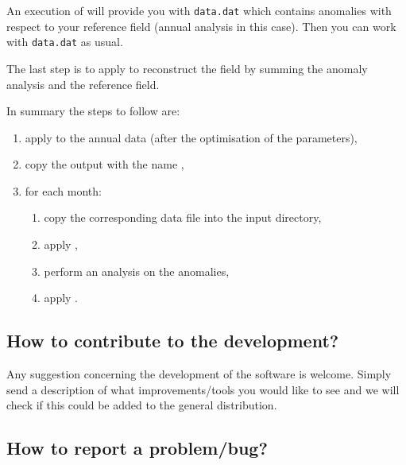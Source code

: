 An execution of  will provide you with \texttt{data.dat} which contains anomalies with respect to your reference field (annual analysis in this case). Then you can work with \texttt{data.dat} as usual. 

The last step is to apply  to reconstruct the field by summing the anomaly analysis and the reference field.

In summary the steps to follow are:

\begin{enumerate} 
\item apply  to the annual data (after the optimisation of the parameters),
\item copy the output  with the name ,
\item for each month:
\begin{enumerate}
\item copy the corresponding data file into the input directory,
\item apply ,
\item perform an analysis on the anomalies,
\item apply .
\end{enumerate}									 
\end{enumerate}
									 
%
%

\subsection{How to contribute to the development?}

Any suggestion concerning the development of the software is welcome. Simply send a description of what improvements/tools you would like to see and we will check if this could be added to the general distribution.


\subsection{How to report a problem/bug?} 

